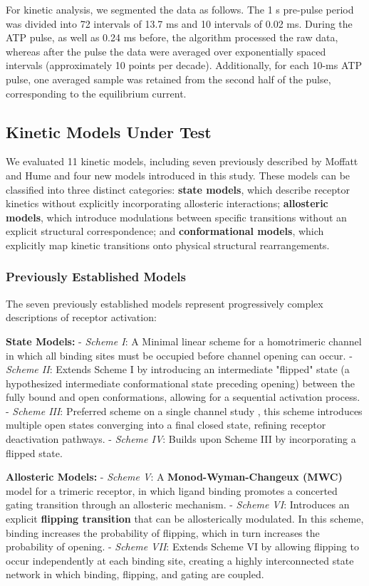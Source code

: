 \documentclass[pdflatex,sn-nature]{sn-jnl}%
\begin{document}
For kinetic analysis, we segmented the data as follows. The 1 s pre-pulse period was divided into 72 intervals of 13.7 ms and 10 intervals of 0.02 ms. During the ATP pulse, as well as 0.24 ms before,  the algorithm processed the raw data, whereas after the pulse the data were averaged over exponentially spaced intervals (approximately 10 points per decade). Additionally, for each 10-ms ATP pulse, one averaged sample  was retained from the second half of the pulse, corresponding to the equilibrium current. 

\subsection{Kinetic Models Under Test}

We evaluated 11 kinetic models, including seven previously described by Moffatt and Hume \cite{Moffatt_hume} and four new models introduced in this study. These models can be classified  into three distinct categories: \textbf{state models}, which describe receptor kinetics without explicitly incorporating allosteric interactions; \textbf{allosteric models}, which introduce modulations between specific transitions without an explicit structural correspondence; and \textbf{conformational models}, which explicitly map kinetic transitions onto physical structural rearrangements.

\subsubsection{Previously Established Models}

The seven previously established models represent progressively complex descriptions of receptor activation:

\textbf{State Models:}  
- \textit{Scheme I}: A Minimal linear scheme for a homotrimeric channel in which all binding sites must be occupied before channel opening can occur.  
- \textit{Scheme II}: Extends Scheme I by introducing an intermediate "flipped" state (a hypothesized intermediate conformational state preceding opening) between the fully bound and open conformations, allowing for a sequential activation process.  
- \textit{Scheme III}: Preferred scheme on a single channel study \cite{properties_single_channe}, this scheme introduces multiple open states converging into a final closed state, refining receptor deactivation pathways.  
- \textit{Scheme IV}: Builds upon Scheme III by incorporating a flipped state.  

\textbf{Allosteric Models:}  
- \textit{Scheme V}: A \textbf{Monod-Wyman-Changeux (MWC)} model for a trimeric receptor, in which ligand binding promotes a concerted gating transition through an allosteric mechanism.  
- \textit{Scheme VI}: Introduces an explicit \textbf{flipping transition} that can be allosterically modulated. In this scheme, binding increases the probability of flipping, which in turn increases the probability of opening.  
- \textit{Scheme VII}: Extends Scheme VI by allowing flipping to occur independently at each binding site, creating a highly interconnected state network in which binding, flipping, and gating are coupled.  
\end{document}
